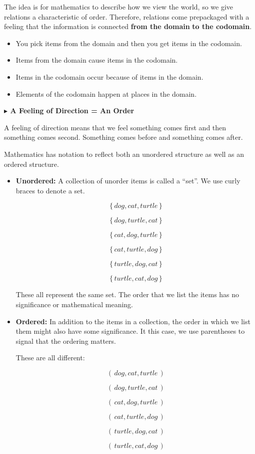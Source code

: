 \documentclass{ximera}
\begin{document}
The idea is for mathematics to describe how we view the world, so we give relations a characteristic of order. Therefore, relations come prepackaged with a feeling that the information is connected \textbf{\textcolor{purple!85!blue}{from the domain}} \textbf{\textcolor{blue!55!black}{to the codomain}}.






\begin{itemize}
\item You pick items from the domain and then you get items in the codomain.
\item Items from the domain cause items in the codomain.
\item Items in the codomain occur because of items in the domain.
\item Elements of the codomain happen at places in the domain.
\end{itemize}




\textbf{\textcolor{red!70!black}{$\blacktriangleright$ A Feeling of Direction = An Order}}

A feeling of direction means that we feel something comes first and then something comes second.  Something comes before and something comes after. 


Mathematics has notation to reflect both an unordered structure as well as an ordered structure. 


\begin{itemize}
\item \textbf{\textcolor{blue!55!black}{Unordered:}}  A collection of unorder items is called a ``set''.  We use curly braces to denote a set.

\[  \{ \, dog, cat, turtle \, \}\]

\[ \{ \, dog, turtle, cat \, \} \]

\[ \{ \, cat, dog, turtle \, \} \]

\[ \{ \, cat, turtle, dog \, \} \]

\[ \{ \, turtle, dog, cat \, \} \]

\[ \{ \, turtle, cat, dog \, \} \]

These all represent the same set.  The order that we list the items has no significance or mathematical meaning.


\item \textbf{\textcolor{blue!55!black}{Ordered:}} In addition to the items in a collection, the order in which we list them might also have some significance.  It this case, we use parentheses to signal that the ordering matters.


These are all different:

\[ ( \, dog, cat, turtle \, ) \]

\[ ( \, dog, turtle, cat \, ) \]

\[ ( \, cat, dog, turtle \, ) \]

\[ ( \, cat, turtle, dog \, ) \]

\[ ( \, turtle, dog, cat \, ) \]

\[ ( \, turtle, cat, dog \, ) \]


\end{itemize}
\end{document}
